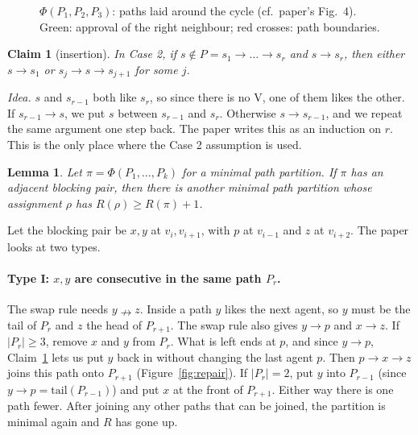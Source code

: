 \documentclass[11pt,a4paper]{article}
\newtheorem{lemma}{Lemma}
\newtheorem{claim}{Claim}
\theoremstyle{definition}
\theoremstyle{remark}
\theoremstyle{plain}
\newcommand{\nlikes}{\nrightarrow}
\begin{document}
\begin{figure}[h]
\centering
{}
\caption{$\Phi(P_1,P_2,P_3)$: paths laid around the cycle (cf.\ paper's Fig.~4). Green: approval of the right neighbour; red crosses: path boundaries.}
\label{fig:phi}
\end{figure}

\begin{claim}[insertion]\label{cl:insert}
In Case 2, if $s\notin P=s_1\to\dots\to s_r$ and $s\to s_r$, then either $s\to s_1$ or $s_j\to s\to s_{j+1}$ for some $j$.
\end{claim}
\noindent\emph{Idea.} $s$ and $s_{r-1}$ both like $s_r$, so since there is no V, one of them likes the other. If $s_{r-1}\to s$, we put $s$ between $s_{r-1}$ and $s_r$. Otherwise $s\to s_{r-1}$, and we repeat the same argument one step back. The paper writes this as an induction on $r$. This is the only place where the Case 2 assumption is used.

\begin{lemma}\label{lem:repair}
Let $\pi=\Phi(P_1,\dots,P_k)$ for a minimal path partition. If $\pi$ has an adjacent blocking pair, then there is another minimal path partition whose assignment $\rho$ has $R(\rho)\ge R(\pi)+1$.
\end{lemma}

Let the blocking pair be $x,y$ at $v_i,v_{i+1}$, with $p$ at $v_{i-1}$ and $z$ at $v_{i+2}$. The paper looks at two types.

\paragraph{Type I: $x,y$ are consecutive in the same path $P_r$.} The swap rule needs $y\nlikes z$. Inside a path $y$ likes the next agent, so $y$ must be the tail of $P_r$ and $z$ the head of $P_{r+1}$. The swap rule also gives $y\to p$ and $x\to z$. If $|P_r|\ge3$, remove $x$ and $y$ from $P_r$. What is left ends at $p$, and since $y\to p$, Claim~\ref{cl:insert} lets us put $y$ back in without changing the last agent $p$. Then $p\to x\to z$ joins this path onto $P_{r+1}$ (Figure~\ref{fig:repair}). If $|P_r|=2$, put $y$ into $P_{r-1}$ (since $y\to p=\mathrm{tail}(P_{r-1})$) and put $x$ at the front of $P_{r+1}$. Either way there is one path fewer. After joining any other paths that can be joined, the partition is minimal again and $R$ has gone up.
\end{document}
